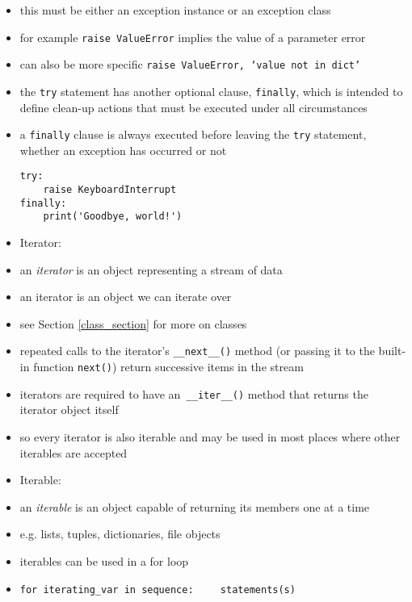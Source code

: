 \documentclass[onecolumn]{IEEEtran} %
\begin{document}
\begin{itemize}
        \bi
            \item this must be either an exception instance or an exception class
        \ei
        \item for example \newline
        \verb|raise ValueError| \newline implies the value of a parameter error
        \item can also be more specific  \newline \verb|raise ValueError, ‘value not in dict’|
        \item the \verb|try| statement has another optional clause, \verb|finally|, which is intended to define clean-up actions that must be executed under all circumstances
        \bi
            \item a \verb|finally| clause is always executed before leaving the \verb|try| statement, whether an exception has occurred or not
        \ei
\begin{verbatim}
try:
    raise KeyboardInterrupt
finally:
    print('Goodbye, world!')
\end{verbatim}
    \ei
    \item Iterator:
    \bi
        \item an \emph{iterator} is an object representing a stream of data
        \bi
            \item an iterator is an object we can iterate over
            \item see Section \ref{class_section} for more on classes
        \ei
        \item repeated calls to the iterator’s \verb|__next__()| method (or passing it to the built-in function \verb|next()|) return successive items in the stream
        \item iterators are required to have an\verb| __iter__()| method that returns the iterator object itself
        \bi
            \item so every iterator is also iterable and may be used in most places where other iterables are accepted
        \ei
    \ei
    \item Iterable:
    \bi
       \item an \emph{iterable} is an object capable of returning its members one at a time
       \item e.g. lists, tuples, dictionaries, file objects
       \item  iterables can be used in a for loop
    \ei
    \item \verb|for iterating_var in sequence:| \newline \verb|    statements(s)|

\end{itemize}
\end{document}
